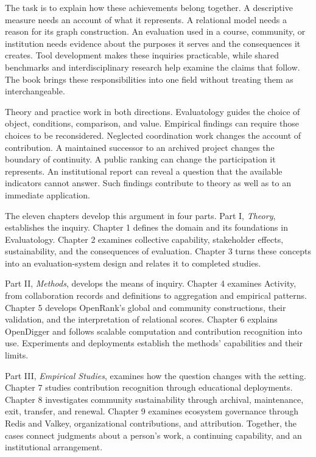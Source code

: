 The task is to explain how these achievements belong together. A descriptive measure needs an account of what it represents. A relational model needs a reason for its graph construction. An evaluation used in a course, community, or institution needs evidence about the purposes it serves and the consequences it creates. Tool development makes these inquiries practicable, while shared benchmarks and interdisciplinary research help examine the claims that follow. The book brings these responsibilities into one field without treating them as interchangeable.

Theory and practice work in both directions. Evaluatology guides the choice of object, conditions, comparison, and value. Empirical findings can require those choices to be reconsidered. Neglected coordination work changes the account of contribution. A maintained successor to an archived project changes the boundary of continuity. A public ranking can change the participation it represents. An institutional report can reveal a question that the available indicators cannot answer. Such findings contribute to theory as well as to an immediate application.

The eleven chapters develop this argument in four parts. Part I, \emph{Theory}, establishes the inquiry. Chapter 1 defines the domain and its foundations in Evaluatology. Chapter 2 examines collective capability, stakeholder effects, sustainability, and the consequences of evaluation. Chapter 3 turns these concepts into an evaluation-system design and relates it to completed studies.

Part II, \emph{Methods}, develops the means of inquiry. Chapter 4 examines Activity, from collaboration records and definitions to aggregation and empirical patterns. Chapter 5 develops OpenRank's global and community constructions, their validation, and the interpretation of relational scores. Chapter 6 explains OpenDigger and follows scalable computation and contribution recognition into use. Experiments and deployments establish the methods' capabilities and their limits.

Part III, \emph{Empirical Studies}, examines how the question changes with the setting. Chapter 7 studies contribution recognition through educational deployments. Chapter 8 investigates community sustainability through archival, maintenance, exit, transfer, and renewal. Chapter 9 examines ecosystem governance through Redis and Valkey, organizational contributions, and attribution. Together, the cases connect judgments about a person's work, a continuing capability, and an institutional arrangement.

